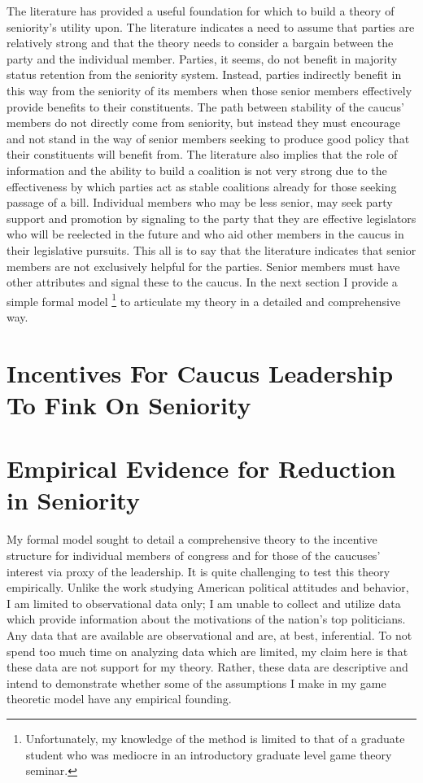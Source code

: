 \documentclass [12pt]{article}
\begin{document}
The literature has provided a useful foundation for which to build a theory of seniority's utility upon. The literature indicates a need to assume that parties are relatively strong and that the theory needs to consider a bargain between the party and the individual member. Parties, it seems, do not benefit in majority status retention from the seniority system. Instead, parties indirectly benefit in this way from the seniority of its members when those senior members effectively provide benefits to their constituents. The path between stability of the caucus' members do not directly come from seniority, but instead they must encourage and not stand in the way of senior members seeking to produce good policy that their constituents will benefit from. The literature also implies that the role of information and the ability to build a coalition is not very strong due to the effectiveness by which parties act as stable coalitions already for those seeking passage of a bill. Individual members who may be less senior, may seek party support and promotion by signaling to the party that they are effective legislators who will be reelected in the future and who aid other members in the caucus in their legislative pursuits. This all is to say that the literature indicates that senior members are not exclusively helpful for the parties. Senior members must have other attributes and signal these to the caucus. In the next section I provide a simple formal model \footnote{Unfortunately, my knowledge of the method is limited to that of a graduate student who was mediocre in an introductory graduate level game theory seminar.} to articulate my theory in a detailed and comprehensive way. 


\section*{Incentives For Caucus Leadership To Fink On Seniority}

\section*{Empirical Evidence for Reduction in Seniority}

My formal model sought to detail a comprehensive theory to the incentive structure for individual members of congress and for those of the caucuses' interest via proxy of the leadership. It is quite challenging to test this theory empirically. Unlike the work studying American political attitudes and behavior, I am limited to observational data only; I am unable to collect and utilize data which provide information about the motivations of the nation's top politicians. Any data that are available are observational and are, at best, inferential. To not spend too much time on analyzing data which are limited, my claim here is that these data are not support for my theory. Rather, these data are descriptive and intend to demonstrate whether some of the assumptions I make in my game theoretic model have any empirical founding.
\end{document}
